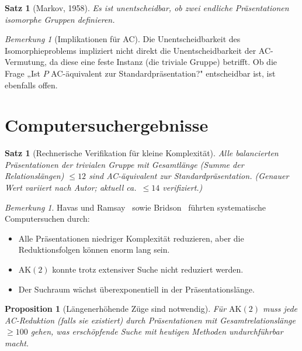 \documentclass[12pt,a4paper]{amsart}
\newtheorem{satz}[theorem]{Satz}
\newtheorem{proposition}[theorem]{Proposition}
\theoremstyle{definition}
\theoremstyle{remark}
\newtheorem{bemerkung}[theorem]{Bemerkung}
\begin{document}
\begin{satz}[Markov, 1958]\label{satz:markov}
Es ist unentscheidbar, ob zwei endliche Präsentationen isomorphe Gruppen definieren.
\end{satz}

\begin{bemerkung}[Implikationen für AC]\label{bem:undec}
Die Unentscheidbarkeit des Isomorphieproblems impliziert nicht direkt die
Unentscheidbarkeit der AC-Vermutung, da diese eine feste Instanz (die triviale Gruppe)
betrifft. Ob die Frage „Ist $P$ AC-äquivalent zur Standardpräsentation?" entscheidbar
ist, ist ebenfalls offen.
\end{bemerkung}

\section{Computersuchergebnisse}

\begin{satz}[Rechnerische Verifikation für kleine Komplexität]\label{satz:comp}
Alle balancierten Präsentationen der trivialen Gruppe mit Gesamtlänge (Summe der
Relationslängen) $\leq 12$ sind AC-äquivalent zur Standardpräsentation.
(Genauer Wert variiert nach Autor; aktuell ca.\ $\leq 14$ verifiziert.)
\end{satz}

\begin{bemerkung}
Havas und Ramsay~\cite{HR03} sowie Bridson~\cite{Bridson15} führten systematische
Computersuchen durch:
\begin{itemize}
  \item Alle Präsentationen niedriger Komplexität reduzieren, aber die
        Reduktionsfolgen können enorm lang sein.
  \item $\mathrm{AK}(2)$ konnte trotz extensiver Suche nicht reduziert werden.
  \item Der Suchraum wächst überexponentiell in der Präsentationslänge.
\end{itemize}
\end{bemerkung}

\begin{proposition}[Längenerhöhende Züge sind notwendig]
Für $\mathrm{AK}(2)$ muss jede AC-Reduktion (falls sie existiert) durch Präsentationen
mit Gesamtrelationslänge $\geq 100$ gehen, was erschöpfende Suche mit heutigen
Methoden undurchführbar macht.
\end{proposition}
\end{document}
